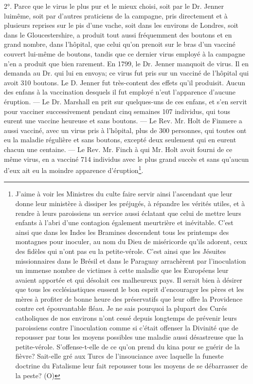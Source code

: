 2°. Parce que le virus le plus pur et le mieux choisi, soit par le Dr. Jenner luimême,\setcounter{page}{367} soit par d'autres praticiens de la campagne, pris directement et à plusieurs reprises sur le pis d'une vache, soit dans les environs de Londres, soit dans le Gloucestershire, a produit tout aussi fréquemment des boutons et en grand nombre, dans l'hôpital, que celui qu'on prenoit sur le bras d'un vacciné couvert lui-même de boutons, tandis que ce dernier virus employé à la campagne n'en a produit que bien rarement. En 1799, le Dr. Jenner manquoit de virus. Il en demanda au Dr. qui lui en envoya; ce virus fut pris sur un vacciné de l'hôpital qui avoit 310 boutons. Le D. Jenner fut très-content des effets qu'il produisit. Aucun des enfans à la vaccination desquels il fut employé n'eut l'apparence d'aucune éruption. — Le Dr. Marshall en prit sur quelques-uns de ces enfans, et s'en servit pour vacciner successivement pendant cinq semaines 107 individus, qui tous eurent une vaccine heureuse et sans boutons. — Le Rev. Mr. Holt de Finmere a aussi vacciné, avec un virus pris à l'hôpital, plus de 300 personnes, qui toutes ont eu la maladie régulière et sans boutons, excepté deux seulement qui en eurent chacun une centaine. — Le Rev. Mr. Finch à qui Mr. Holt avoit fourni de ce même virus, en a vacciné 714 individus avec le plus grand succès\setcounter{page}{368} et sans qu'aucun d'eux ait eu la moindre apparence d'éruption\footnote{J'aime à voir les Ministres du culte faire servir ainsi l'ascendant que leur donne leur ministère à dissiper les préjugés, à répandre les vérités utiles, et à rendre à leurs paroissiens un service aussi éclatant que celui de mettre leurs enfants à l'abri d'une contagion également meurtrière et inévitable. C'est ainsi que dans les Indes les Bramines descendent tous les printemps des montagnes pour inoculer, au nom du Dieu de miséricorde qu'ils adorent, ceux des fidèles qui n'ont pas eu la petite-vérole. C'est ainsi que les Jésuites missionnaires dans le Brésil et dans le Paraguay arrachèrent par l'inoculation un immense nombre de victimes à cette maladie que les Européens leur avaient apportée et qui désolait ces malheureux pays. Il serait bien à désirer que tous les ecclésiastiques eussent le bon esprit d'encourager les pères et les mères à profiter de bonne heure des préservatifs que leur offre la Providence contre cet épouvantable fléau. Je ne sais pourquoi la plupart des Curés catholiques de nos environs n'ont cessé depuis longtemps de prévenir leurs paroissiens contre l'inoculation comme si c'était offenser la Divinité que de repousser par tous les moyens possibles une maladie aussi désastreuse que la petite-vérole. S'offense-t-elle de ce qu'on prend du kina pour se guérir de la fièvre? Sait-elle gré aux Turcs de l'insouciance avec laquelle la funeste doctrine du Fatalisme leur fait repousser tous les moyens de se débarrasser de la peste? (O)}.
